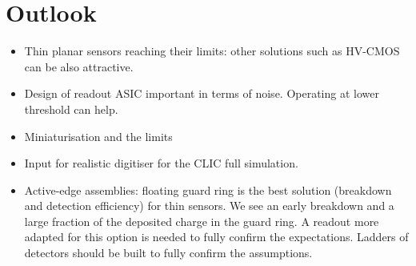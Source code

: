 \section{Outlook}
\begin{itemize}
\item Thin planar sensors reaching their limits: other solutions such
  as HV-CMOS can be also attractive.
\item Design of readout ASIC important in terms of noise. Operating at
  lower threshold can help.
\item Miniaturisation and the limits
\item Input for realistic digitiser for the CLIC full simulation. 
\item Active-edge assemblies: floating guard ring is the best solution
  (breakdown and detection efficiency) for thin sensors. We see an
  early breakdown and a large fraction of the deposited charge in the
  guard ring. A readout more adapted for this option is needed to
  fully confirm the expectations. Ladders of detectors should be built
  to fully confirm the assumptions.
\end{itemize}
